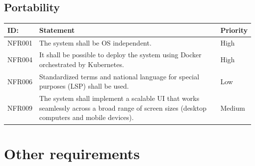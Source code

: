 \documentclass{scrreprt}
\begin{document}
\subsection{Portability}

\begin{center}
\begin{tabularx}{\linewidth}{| l | X | l |}
\hline
\textbf{ID:} & \textbf{Statement} & \textbf{Priority} \\
\hline
NFR001 & 
The system shall be OS independent. &
High \\ 
\hline
NFR004 & 
It shall be possible to deploy the system using Docker orchestrated by Kubernetes.&
High \\ 
\hline
NFR006 & 
Standardized terms and national language for special purposes (LSP) shall be used. &
Low \\ 
\hline
NFR009 & 
The system shall implement a scalable UI that works seamlessly across a broad range of screen sizes (desktop computers and mobile devices). &
Medium \\ 
\hline
\end{tabularx}
\end{center}


\section{Other requirements}
\end{document}
